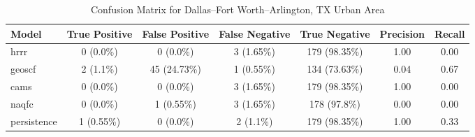 \begin{table}[h!]
\centering
\begin{tabular}{lcccccc}
\hline
Model & True Positive & False Positive & False Negative & True Negative & Precision & Recall\\ \hline
hrrr & 0 (0.0\%) & 0 (0.0\%) & 3 (1.65\%) & 179 (98.35\%) & \cellcolor{green!25}1.00 & \cellcolor{red!25}0.00 \\ 
geoscf & 2 (1.1\%) & 45 (24.73\%) & 1 (0.55\%) & 134 (73.63\%) & \cellcolor{red!25}0.04 & \cellcolor{green!25}0.67 \\ 
cams & 0 (0.0\%) & 0 (0.0\%) & 3 (1.65\%) & 179 (98.35\%) & \cellcolor{green!25}1.00 & \cellcolor{red!25}0.00 \\ 
naqfc & 0 (0.0\%) & 1 (0.55\%) & 3 (1.65\%) & 178 (97.8\%) & \cellcolor{red!25}0.00 & \cellcolor{red!25}0.00 \\ 
persistence & 1 (0.55\%) & 0 (0.0\%) & 2 (1.1\%) & 179 (98.35\%) & 1.00 & 0.33 \\ 
\hline
\end{tabular}
\caption{Confusion Matrix for Dallas--Fort Worth--Arlington, TX Urban Area}
\end{table}
